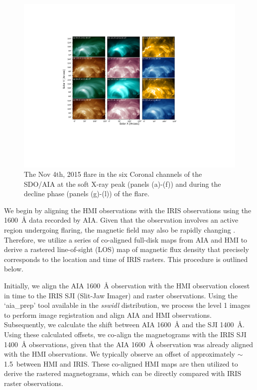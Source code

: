 \begin{figure}[ht!]
    \begin{center}
        \includegraphics[trim={4.7cm 5.5cm 6.5cm 4.2cm},clip,width=\textwidth]{Figures/nov_flare_aia_waves_2.pdf}
    \end{center}
    \caption[The six coronal channel observations from SDO/AIA for the Nov 4th, 2015 flare.]{The Nov 4th, 2015 flare in the six Coronal channels of the SDO/AIA at the soft X-ray peak (panels (a)-(f)) and during the decline phase (panels (g)-(l)) of the flare.}
    \label{flare_m_aia}
\end{figure}

We begin by aligning the HMI observations with the IRIS observations using the 1600~{\AA} data recorded by AIA. Given that the observation involves an active region undergoing flaring, the magnetic field may also be rapidly changing \citep{wang02,dandan16,spirock02}. Therefore, we utilize a series of co-aligned full-disk maps from AIA and HMI to derive a rastered line-of-sight (LOS) map of magnetic flux density that precisely corresponds to the location and time of IRIS rasters. This procedure is outlined below.

Initially, we align the AIA 1600~{\AA} observation with the HMI observation closest in time to the IRIS SJI (Slit-Jaw Imager) and raster observations. Using the `aia\_prep' tool available in the \textit{sswidl} distribution, we process the level 1 images to perform image registration and align AIA and HMI observations. Subsequently, we calculate the shift between AIA 1600~{\AA} and the SJI 1400~{\AA}. Using these calculated offsets, we co-align the magnetograms with the IRIS SJI 1400~{\AA} observations, given that the AIA 1600~{\AA} observation was already aligned with the HMI observations. We typically observe an offset of approximately $\sim$ 1.5\arcsec~between HMI and IRIS. These co-aligned HMI maps are then utilized to derive the rastered magnetograms, which can be directly compared with IRIS raster observations.

